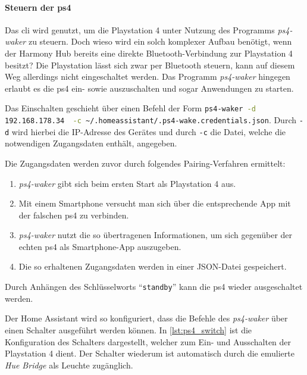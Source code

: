 \paragraph{Steuern der \ac{ps4}}
Das \ac{cli} wird genutzt, um die Playstation 4 unter Nutzung des Programms \textit{ps4-waker} \cite{dhleongp12:online} zu steuern.
Doch wieso wird ein solch komplexer Aufbau benötigt, wenn der Harmony Hub bereits eine direkte Bluetooth-Verbindung zur Playstation 4 besitzt?
Die Playstation lässt sich zwar per Bluetooth steuern,
kann auf diesem Weg allerdings nicht eingeschaltet werden.
Das Programm \textit{ps4-waker} hingegen erlaubt es die \ac{ps4} ein- sowie auszuschalten und sogar Anwendungen zu starten.

Das Einschalten geschieht über einen Befehl der Form \lstinline[language=bash]{ps4-waker -d 192.168.178.34  -c ~/.homeassistant/.ps4-wake.credentials.json}.
Durch \lstinline[language=bash]{-d} wird hierbei die IP-Adresse des Gerätes und
durch \lstinline[language=bash]{-c} die Datei,
welche die notwendigen Zugangsdaten enthält, angegeben.

Die Zugangsdaten werden zuvor durch folgendes Pairing-Verfahren ermittelt:
\begin{enumerate}
    \setlength\itemsep{-0.5em}
    \item \textit{ps4-waker} gibt sich beim ersten Start als Playstation 4 aus.
    \item Mit einem Smartphone versucht man sich über die entsprechende App mit der falschen \ac{ps4} zu verbinden.
    \item \textit{ps4-waker} nutzt die so übertragenen Informationen, um sich gegenüber der echten \ac{ps4} als Smartphone-App auszugeben.
    \item Die so erhaltenen Zugangsdaten werden in einer JSON-Datei gespeichert.
\end{enumerate}

Durch Anhängen des Schlüsselworts \enquote{\lstinline[language=bash]{standby}} kann die
\ac{ps4} wieder ausgeschaltet werden.

Der Home Assistant wird so konfiguriert,
dass die Befehle des \textit{ps4-waker} über einen Schalter ausgeführt werden können.
In \autoref{lst:ps4_switch} ist die Konfiguration des Schalters dargestellt,
welcher zum Ein- und Ausschalten der Playstation 4 dient.
Der Schalter wiederum ist automatisch durch die emulierte \textit{Hue Bridge} als Leuchte zugänglich.



